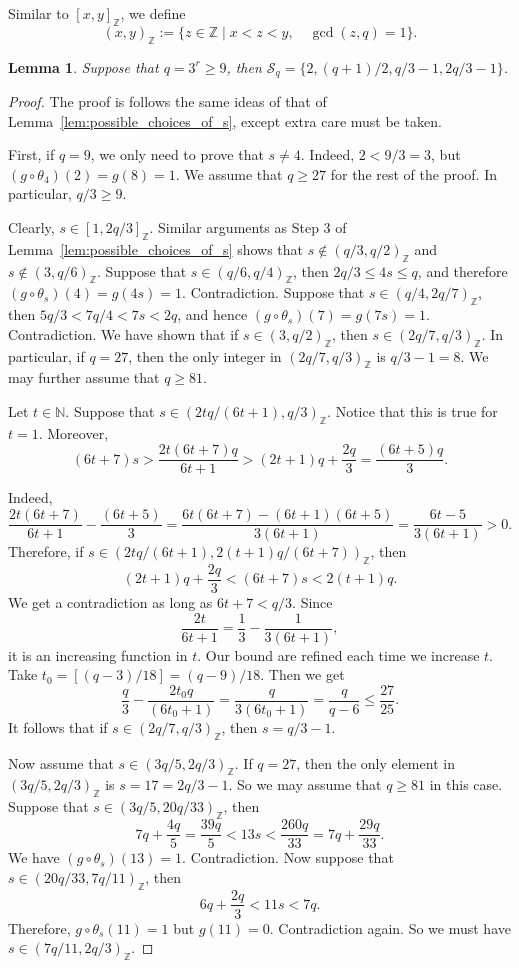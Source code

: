\documentclass{amsart}[11pt]
\newtheorem{lem}[thm]{Lemma}
\theoremstyle{definition}
\numberwithin{equation}{section}
\theoremstyle{notitle}
\begin{document}
Similar to $[x,y]_{\mathbb{Z}}$, we define 
\[ (x,y)_{\mathbb{Z}}:=\{z\in {\mathbb{Z}}\mid x< z< y, \quad \gcd(z, q)=1\}.\]

\begin{lem}\label{lem:pos_choice_of_s_when_q_is_power_of_3}
Suppose that $q=3^r\geq 9$, then ${\mathscr{S}}_q=\{
2, (q+1)/2, q/3-1, 2q/3-1\}$.  
\end{lem}
\begin{proof}
  The proof is follows the same ideas of that of
  Lemma~\ref{lem:possible_choices_of_s}, except extra care must be
  taken.

  First, if $q=9$, we only need to prove that $s\neq 4$. Indeed,
  $2<9/3=3$, but $(g\circ \theta_4)(2)= g(8)=1$. We assume that $q\geq
  27$ for the rest of the proof. In particular, $q/3\geq 9$.

  Clearly, $s\in [1, 2q/3]_{\mathbb{Z}}$. Similar arguments as Step 3 of
  Lemma~\ref{lem:possible_choices_of_s} shows that $s\not\in (q/3,
  q/2)_{\mathbb{Z}}$ and $s\not\in (3, q/6)_{\mathbb{Z}}$. Suppose that $s\in (q/6,
  q/4)_{\mathbb{Z}}$, then $2q/3\leq 4s \leq q$, and therefore $(g\circ \theta_s)
  (4)= g(4s)=1$. Contradiction. Suppose that $s\in (q/4, 2q/7)_{\mathbb{Z}}$,
  then $5q/3 < 7q/4 < 7s < 2q$, and hence $(g\circ \theta_s) (7)=
  g(7s)=1$. Contradiction. We have shown that if $s\in (3, q/2)_{\mathbb{Z}}$,
  then $s\in (2q/7, q/3)_{\mathbb{Z}}$.  In particular, if $q=27$, then the
  only integer in $(2q/7, q/3)_{\mathbb{Z}}$ is $q/3-1=8$. We may further
  assume that $q\geq 81$.

 
Let $t\in {\mathbb{N}}$. Suppose that $s\in (2tq/(6t+1), q/3)_{\mathbb{Z}}$. Notice that
this is true for $t=1$. Moreover, 
\[ (6t+7)s > \frac{2t(6t+7)q}{6t+1}>
(2t+1)q+\frac{2q}{3}=\frac{(6t+5)q}{3}. \]

Indeed,
\[ \frac{2t(6t+7)}{6t+1}-\frac{(6t+5)}{3}=
\frac{6t(6t+7)-(6t+1)(6t+5)}{3(6t+1)}= \frac{6t-5}{3(6t+1)}>0.\]
Therefore, if $s \in (2tq/(6t+1), 2(t+1)q/(6t+7))_{\mathbb{Z}}$, then 
\[ (2t+1)q+\frac{2q}{3}    < (6t+7)s < 2(t+1)q.\]
We get a contradiction as long as $6t+7 <q/3$. Since
\[ \frac{2t}{6t+1}= \frac{1}{3} - \frac{1}{3(6t+1)},\] it is an
increasing function in $t$. Our bound are refined each time we
increase $t$. Take $t_0=[(q-3)/18]= (q-9)/18$. Then we get
\[\frac{q}{3}- \frac{2t_0q}{(6t_0+1)}=
\frac{q}{3(6t_0+1)}=\frac{q}{q-6}\leq \frac{27}{25}.\]
It follows that if $s\in (2q/7, q/3)_{\mathbb{Z}}$, then $s=q/3-1$. 

Now assume that $s\in (3q/5, 2q/3)_{\mathbb{Z}}$. If $q=27$, then the only
element in $(3q/5, 2q/3)_{\mathbb{Z}}$ is $s=17= 2q/3-1$. So we may assume that
$q\geq 81$ in this case.  Suppose that $s\in (3q/5, 20q/33)_{\mathbb{Z}}$, then 
\[ 7q+\frac{4q}{5}=\frac{39q}{5}< 13s < \frac{260q}{33}=
7q+\frac{29q}{33}. \] We have $(g\circ \theta_s)
(13)=1$. Contradiction.  Now suppose that $s \in (20q/33, 7q/11)_{\mathbb{Z}}$,
then
\[  6q+\frac{2q}{3}<   11s < 7q.\]
Therefore, $g\circ \theta_s (11)=1$ but $g(11)=0$. Contradiction
again. So we must have $s \in (7q/11, 2q/3)_{\mathbb{Z}}$. 


\end{proof}
\end{document}
